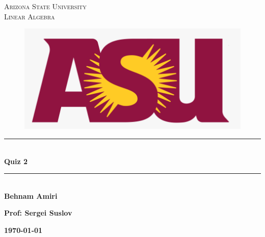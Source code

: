\documentclass[fleqn]{article}
\begin{document}
  \begin{titlepage}

    \newcommand{\HRule}{\rule{\linewidth}{0.5mm}}

    \center


    \textsc{\LARGE Arizona State University}\\[1.5cm]

    \textsc{\LARGE Linear Algebra }\\[1.5cm]


    \begin{figure}
      \includegraphics[width=\linewidth]{asu.png}
    \end{figure}


    \HRule \\[0.4cm]
    { \huge \bfseries Quiz 2}\\[0.4cm] 
    \HRule \\[1.5cm]

    \textbf{Behnam Amiri}

    \bigbreak

    \textbf{Prof: Sergei Suslov}

    \bigbreak


    \textbf{{\large \today}\\[2cm]}

    \vfill

  \end{titlepage}
\end{document}
